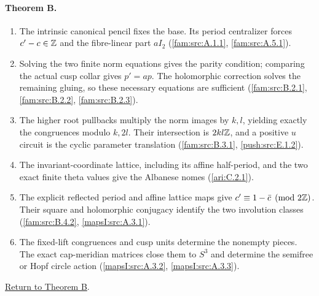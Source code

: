 \documentclass[11pt,a4paper]{article}
\theoremstyle{definition}
\begin{document}
\hypertarget{outline-I-B}{}
\paragraph{Theorem B.}
\begin{enumerate}[label=\arabic*.]
\item\hypertarget{step-I-B-1}{} The intrinsic canonical pencil
fixes the base.  Its period centralizer forces $c'-c\in\mathbb Z$ and
the fibre-linear part $aI_2$
(\hyperref[fam:src:A.1.1]{\ref*{fam:src:A.1.1}},
\hyperref[fam:src:A.5.1]{\ref*{fam:src:A.5.1}}).
\item\hypertarget{step-I-B-2}{} Solving the two finite norm
equations gives the parity condition; comparing the actual cusp
collar gives $p'=ap$.  The holomorphic correction solves the
remaining gluing, so these necessary equations are sufficient
(\hyperref[fam:src:B.2.1]{\ref*{fam:src:B.2.1}},
\hyperref[fam:src:B.2.2]{\ref*{fam:src:B.2.2}},
\hyperref[fam:src:B.2.3]{\ref*{fam:src:B.2.3}}).
\item\hypertarget{step-I-B-3}{} The higher root pullbacks multiply
the norm images by $k,l$, yielding exactly the congruences modulo
$k,2l$.  Their intersection is $2kl\mathbb Z$, and a positive $u$
circuit is the cyclic parameter translation
(\hyperref[fam:src:B.3.1]{\ref*{fam:src:B.3.1}},
\hyperref[push:src:E.1.2]{\ref*{push:src:E.1.2}}).
\item\hypertarget{step-I-B-4}{} The invariant-coordinate lattice,
including its affine half-period, and the two exact finite theta
values give the Albanese nomes
(\hyperref[ari:C.2.1]{\ref*{ari:C.2.1}}).
\item\hypertarget{step-I-B-5}{} The explicit reflected period
and affine lattice maps give $c'\equiv1-\bar c\pmod{2\mathbb Z}$.
Their square and holomorphic conjugacy identify the two
involution classes
(\hyperref[fam:src:B.4.2]{\ref*{fam:src:B.4.2}},
\hyperref[mapsI:src:A.3.1]{\ref*{mapsI:src:A.3.1}}).
\item\hypertarget{step-I-B-6}{} The fixed-lift congruences and
cusp units determine the nonempty pieces.  The exact cap-meridian
matrices close them to $S^3$ and determine the semifree or Hopf
circle action
(\hyperref[mapsI:src:A.3.2]{\ref*{mapsI:src:A.3.2}},
\hyperref[mapsI:src:A.3.3]{\ref*{mapsI:src:A.3.3}}).
\end{enumerate}
\hyperlink{main-I-B}{Return to Theorem B}.

\hypertarget{outline-I-C}{}
\end{document}
